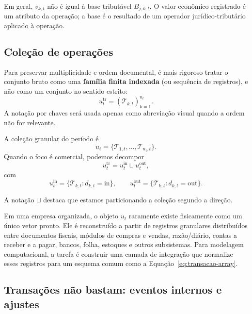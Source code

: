 \documentclass[11pt,a4paper]{article}
\newcommand{\cT}{\mathcal{T}}
\begin{document}
\begin{cuidado}
Em geral, $v_{k,t}$ não é igual à base tributável $B_{j,k,t}$. O valor econômico registrado é um atributo da operação; a base é o resultado de um operador jurídico-tributário aplicado à operação.
\end{cuidado}

\subsection{Coleção de operações}

Para preservar multiplicidade e ordem documental, é mais rigoroso tratar o conjunto bruto como uma \textbf{família finita indexada} (ou sequência de registros), e não como um conjunto no sentido estrito:
\begin{equation}
\boxed{u_t^{\mathrm{tr}}=(\cT_{k,t})_{k=1}^{n_t}.}
\label{eq:u-indexed}
\end{equation}
A notação por chaves será usada apenas como abreviação visual quando a ordem não for relevante.

A coleção granular do período é
\begin{equation}
\boxed{u_t=\{\cT_{1,t},\ldots,\cT_{n_t,t}\}.}
\end{equation}
Quando o foco é comercial, podemos decompor
\begin{equation}
\boxed{u_t^{\mathrm{tr}}=u_t^{\mathrm{in}}\sqcup u_t^{\mathrm{out}},}
\end{equation}
com
\[
u_t^{\mathrm{in}}=\{\cT_{k,t}:d_{k,t}=\mathrm{in}\},
\qquad
u_t^{\mathrm{out}}=\{\cT_{k,t}:d_{k,t}=\mathrm{out}\}.
\]

A notação $\sqcup$ destaca que estamos particionando a coleção segundo a direção.

\begin{intuicao}
Em uma empresa organizada, o objeto $u_t$ raramente existe fisicamente como um único vetor pronto. Ele é reconstruído a partir de registros granulares distribuídos entre documentos fiscais, módulos de compras e vendas, razão/diário, contas a receber e a pagar, bancos, folha, estoques e outros subsistemas. Para modelagem computacional, a tarefa é construir uma camada de integração que normalize esses registros para um esquema comum como a Equação~\eqref{eq:transacao-array}.
\end{intuicao}

\subsection{Transações não bastam: eventos internos e ajustes}
\end{document}
